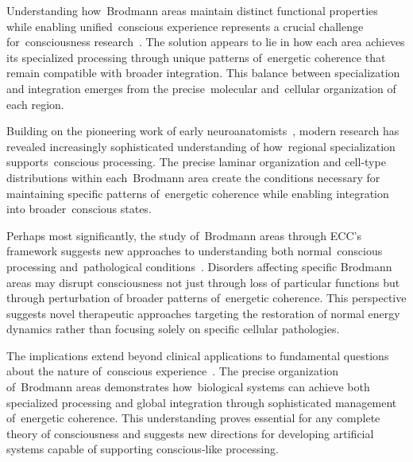 Understanding how~Brodmann areas maintain distinct functional properties while enabling unified~conscious experience represents a crucial challenge for~consciousness research~\cite{Scholtens2014, Glasser2016}. The solution appears to lie in how each area achieves its specialized processing through unique patterns of~energetic coherence that remain compatible with broader integration. This balance between specialization and integration emerges from the precise~molecular and~cellular organization of each region.

Building on the pioneering work of early neuroanatomists~\cite{Vogt1919, Brodmann1909}, modern research has revealed increasingly sophisticated understanding of how~regional specialization supports~conscious processing. The precise laminar organization and cell-type distributions within each~Brodmann area create the conditions necessary for maintaining specific patterns of~energetic coherence while enabling integration into broader~conscious states.

Perhaps most significantly, the study of~Brodmann areas through ECC's framework suggests new approaches to understanding both normal~conscious processing and~pathological conditions~\cite{Amunts2015, Girdhar2025}. Disorders affecting specific Brodmann areas may disrupt consciousness not just through loss of particular functions but through perturbation of broader patterns of~energetic coherence. This perspective suggests novel therapeutic approaches targeting the restoration of normal energy dynamics rather than focusing solely on specific cellular pathologies.

The implications extend beyond clinical applications to fundamental questions about the nature of~conscious experience~\cite{Palomero-Gallagher2019, Hameroff2014}. The precise organization of~Brodmann areas demonstrates how~biological systems can achieve both specialized processing and global integration through sophisticated management of~energetic coherence. This understanding proves essential for any complete theory of consciousness and suggests new directions for developing artificial systems capable of supporting conscious-like processing.

